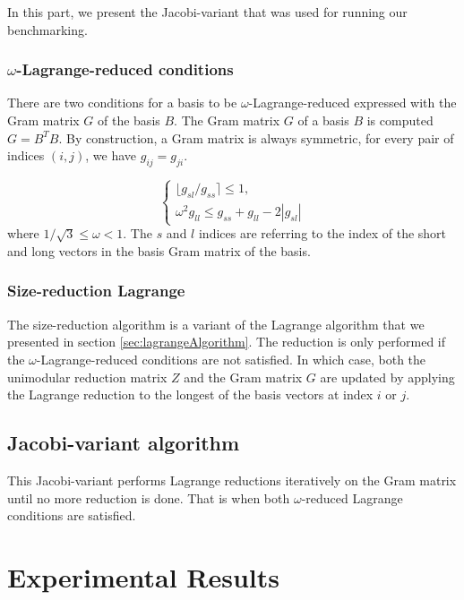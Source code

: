 \documentclass[10pt, a4paper]{article}
\begin{document}
In this part, we present the Jacobi-variant that was used for running our benchmarking.

\subsubsection{$\omega$-Lagrange-reduced conditions}
There are two conditions for a basis to be $\omega$-Lagrange-reduced expressed with the Gram matrix $G$ of the basis $B$. The Gram matrix $G$ of a basis $B$ is computed $G = B^T B$. By construction, a Gram matrix is always symmetric, for every pair of indices $(i,j)$, we have $g_{ij} = g_{ji}$.

\[
\begin{cases}
\lfloor g_{sl} / g_{ss} \rceil \leq 1, \\
\omega^2 g_{ll} \leq g_{ss} + g_{ll} - 2|g_{sl}|

\end{cases}
\]  where $1/\sqrt{3} \leq \omega < 1$. The $s$ and $l$ indices are referring to the index of the short and long vectors in the basis Gram matrix of the basis. 

\subsubsection{Size-reduction Lagrange}
The size-reduction algorithm is a variant of the Lagrange algorithm that we presented in section \ref{sec:lagrangeAlgorithm}. The reduction is only performed if the $\omega$-Lagrange-reduced conditions are not satisfied. In which case, both the unimodular reduction matrix $Z$ and the Gram matrix $G$ are updated by applying the Lagrange reduction to the longest of the basis vectors at index $i$ or $j$.



\subsection{Jacobi-variant algorithm}
This Jacobi-variant performs Lagrange reductions iteratively on the Gram matrix until no more reduction is done. That is when both $\omega$-reduced Lagrange conditions are satisfied. 



\section{Experimental Results}
\end{document}
